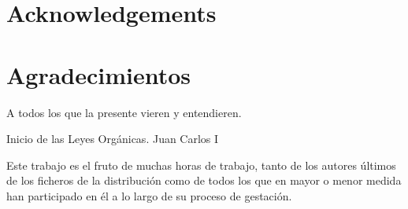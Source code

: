 %
%
%
% 
%
%
%
%

\thispagestyle{empty}

{
  \chapter*{Acknowledgements}
  \label{cha:acknowledgements}
}
{
  \chapter*{Agradecimientos}
  \label{cha:agradecimientos}
}




\begin{FraseCelebre}
  \begin{Frase}
    A todos los que la presente vieren y entendieren.
  \end{Frase}
  \begin{Fuente}
    Inicio de las Leyes Orgánicas. Juan Carlos I
  \end{Fuente}
\end{FraseCelebre}



Este trabajo es el fruto de muchas horas de trabajo, tanto de los
autores últimos de los ficheros de la distribución como de todos los que
en mayor o menor medida han participado en él a lo largo de su proceso
de gestación.

